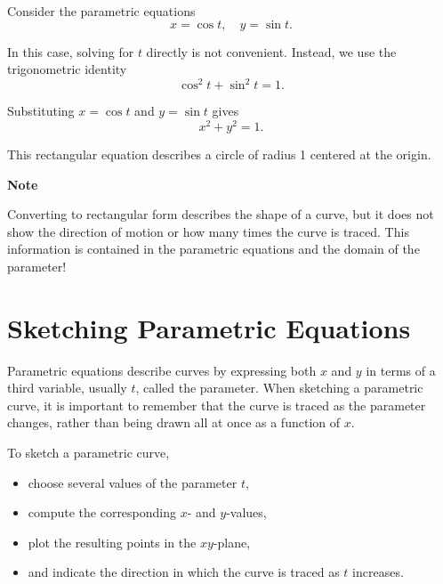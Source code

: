 \begin{Worked}
\begin{Problem}
Consider the parametric equations
\begin{equation*}
    x = \cos t, \quad y = \sin t.
\end{equation*}
\end{Problem}
\begin{Solution}
In this case, solving for $t$ directly is not convenient. Instead, we use
the trigonometric identity
\begin{equation*}
    \cos^2 t + \sin^2 t = 1.
\end{equation*}

Substituting $x = \cos t$ and $y = \sin t$ gives
\begin{equation*}
    x^2 + y^2 = 1.
\end{equation*}

This rectangular equation describes a circle of radius 1 centered at the
origin.
\end{Solution}
\end{Worked}

\textbf{Note}

Converting to rectangular form describes the shape of a curve, but it
does not show the direction of motion or how many
times the curve is traced. This information is contained in the parametric
equations and the domain of the parameter!


\section{Sketching Parametric Equations}

Parametric equations describe curves by expressing both $x$ and $y$ in terms
of a third variable, usually $t$, called the parameter. When sketching a
parametric curve, it is important to remember that the curve is traced as the
parameter changes, rather than being drawn all at once as a function of $x$.

To sketch a parametric curve,
\begin{itemize}
    \item choose several values of the parameter $t$,
    \item compute the corresponding $x$- and $y$-values,
    \item plot the resulting points in the $xy$-plane,
    \item and indicate the direction in which the curve is traced as $t$
          increases.
\end{itemize}

